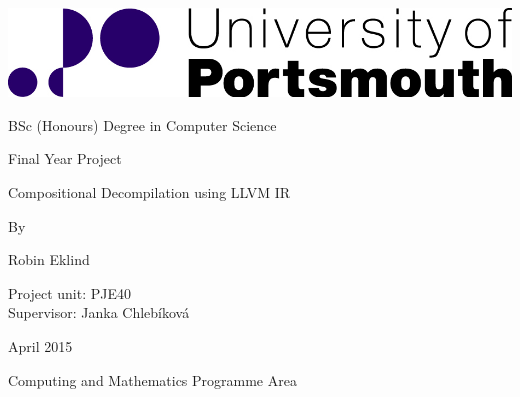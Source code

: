 \documentclass[12pt, a4paper]{article}
\begin{document}
\includegraphics[width=\linewidth]{logo.png}

\vspace*{2.5cm}

\sffamily \bfseries

\fontsize{28pt}{0pt}\selectfont
BSc (Honours) Degree in Computer Science

\vspace*{1.45cm}

\fontsize{20pt}{0pt}\selectfont
Final Year Project

\vspace*{4.77cm}

\fontsize{16pt}{0pt}\selectfont
Compositional Decompilation using LLVM IR

\vspace*{2.13cm}

By

\vspace*{0.86cm}

Robin Eklind

\vspace*{0.86cm}

Project unit: PJE40 \\
Supervisor: Janka Chlebíková

\vspace*{2.4cm}

April 2015

\vfill

\fontsize{14pt}{0pt}\selectfont
Computing and Mathematics Programme Area
\end{document}
